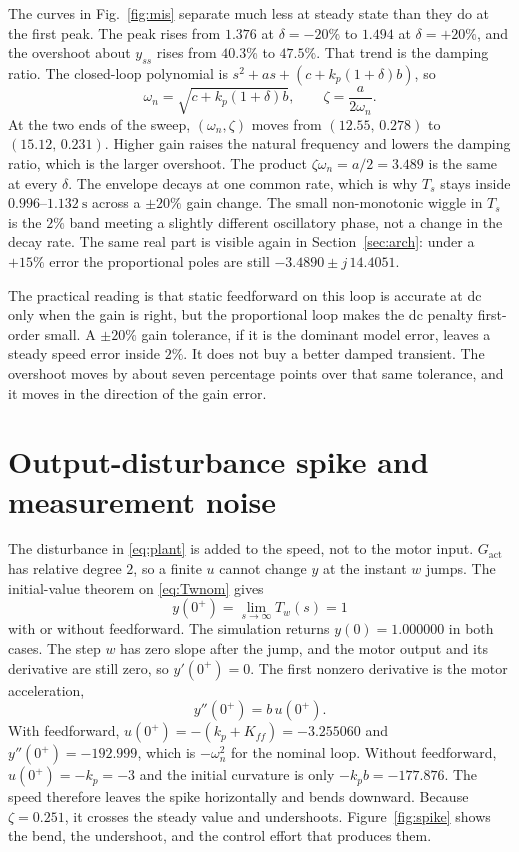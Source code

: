 \documentclass[12pt,a4paper]{article}
\begin{document}
The curves in Fig.~\ref{fig:mis} separate much less at steady state than they do at the first peak.
The peak rises from \(1.376\) at \(\delta=-20\%\) to \(1.494\) at \(\delta=+20\%\), and the overshoot about \(y_{ss}\) rises from \(40.3\%\) to \(47.5\%\).
That trend is the damping ratio. The closed-loop polynomial is \(s^2+as+(c+k_p(1+\delta)b)\), so
\[
  \omega_n=\sqrt{c+k_p(1+\delta)b},\qquad
  \zeta=\frac{a}{2\omega_n}.
\]
At the two ends of the sweep, \((\omega_n,\zeta)\) moves from \((12.55,\,0.278)\) to \((15.12,\,0.231)\).
Higher gain raises the natural frequency and lowers the damping ratio, which is the larger overshoot.
The product \(\zeta\omega_n=a/2=3.489\) is the same at every \(\delta\).
The envelope decays at one common rate, which is why \(T_s\) stays inside \(0.996\)--\(1.132~\mathrm{s}\) across a \(\pm 20\%\) gain change.
The small non-monotonic wiggle in \(T_s\) is the \(2\%\) band meeting a slightly different oscillatory phase, not a change in the decay rate.
The same real part is visible again in Section~\ref{sec:arch}: under a \(+15\%\) error the proportional poles are still \(-3.4890\pm j\,14.4051\).

The practical reading is that static feedforward on this loop is accurate at dc only when the gain is right, but the proportional loop makes the dc penalty first-order small.
A \(\pm 20\%\) gain tolerance, if it is the dominant model error, leaves a steady speed error inside \(2\%\).
It does not buy a better damped transient. The overshoot moves by about seven percentage points over that same tolerance, and it moves in the direction of the gain error.

\section{Output-disturbance spike and measurement noise}
\label{sec:spike}

The disturbance in \eqref{eq:plant} is added to the speed, not to the motor input.
\(G_{\mathrm{act}}\) has relative degree \(2\), so a finite \(u\) cannot change \(y\) at the instant \(w\) jumps.
The initial-value theorem on \eqref{eq:Twnom} gives
\[
  y(0^+)=\lim_{s\to\infty}T_w(s)=1
\]
with or without feedforward. The simulation returns \(y(0)=1.000000\) in both cases.
The step \(w\) has zero slope after the jump, and the motor output and its derivative are still zero, so \(y'(0^+)=0\).
The first nonzero derivative is the motor acceleration,
\begin{equation}
  y''(0^+)=b\,u(0^+).
  \label{eq:ydd}
\end{equation}
With feedforward, \(u(0^+)=-(k_p+K_{ff})=-3.255060\) and \(y''(0^+)=-192.999\), which is \(-\omega_n^2\) for the nominal loop.
Without feedforward, \(u(0^+)=-k_p=-3\) and the initial curvature is only \(-k_p b=-177.876\).
The speed therefore leaves the spike horizontally and bends downward. Because \(\zeta=0.251\), it crosses the steady value and undershoots.
Figure~\ref{fig:spike} shows the bend, the undershoot, and the control effort that produces them.
\end{document}

